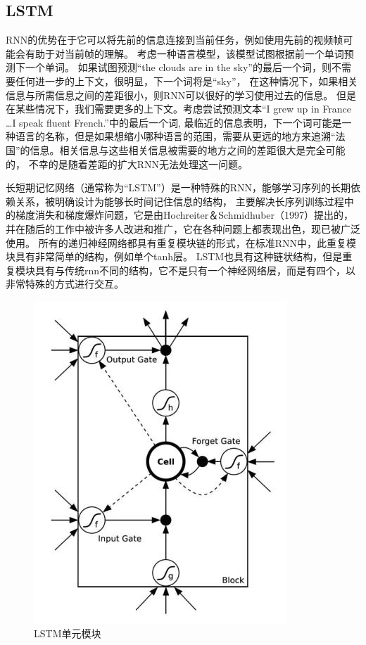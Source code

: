   
\subsection{LSTM}
  RNN的优势在于它可以将先前的信息连接到当前任务，例如使用先前的视频帧可能会有助于对当前帧的理解。
  考虑一种语言模型，该模型试图根据前一个单词预测下一个单词。
  如果试图预测“the clouds are in the sky”的最后一个词，则不需要任何进一步的上下文，很明显，下一个词将是“sky”，
  在这种情况下，如果相关信息与所需信息之间的差距很小，则RNN可以很好的学习使用过去的信息。
  但是在某些情况下，我们需要更多的上下文。考虑尝试预测文本“I grew up in France \dots I speak fluent French.”中的最后一个词,
  最临近的信息表明，下一个词可能是一种语言的名称，但是如果想缩小哪种语言的范围，需要从更远的地方来追溯“法国”的信息。相关信息与这些相关信息被需要的地方之间的差距很大是完全可能的，
不幸的是随着差距的扩大RNN无法处理这一问题。

长短期记忆网络（通常称为“LSTM”）是一种特殊的RNN，能够学习序列的长期依赖关系，被明确设计为能够长时间记住信息的结构，
主要解决长序列训练过程中的梯度消失和梯度爆炸问题，它是由Hochreiter＆Schmidhuber（1997）提出的，
并在随后的工作中被许多人改进和推广，它在各种问题上都表现出色，现已被广泛使用。
所有的递归神经网络都具有重复模块链的形式，在标准RNN中，此重复模块具有非常简单的结构，例如单个tanh层。
LSTM也具有这种链状结构，但是重复模块具有与传统rnn不同的结构，它不是只有一个神经网络层，而是有四个，以非常特殊的方式进行交互。

\begin{figure}[htbp]
  \centering
  \includegraphics[scale=0.8]{./images/LSTM.jpg}
  \caption{LSTM单元模块\cite{sundermeyer2012lstm}}
  \label{fig:LSTM}
\end{figure}

